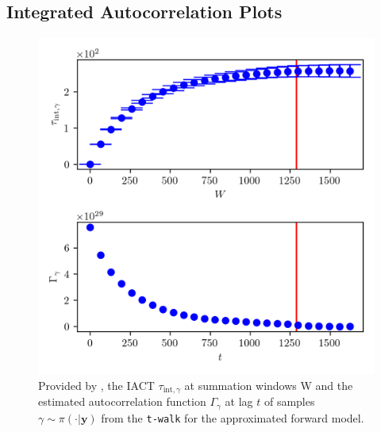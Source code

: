 \subsection{Integrated Autocorrelation Plots} 
\begin{figure}[ht!]
	\centering
	\includegraphics{UwerrTauIntTWalk0.png}
	\caption[IACT and autocorrelation function of samples $\gamma \sim \pi(\cdot|\bm{y})$, for approximated model.]{Provided by \cite{drikHesse}, the IACT $\tau_{\text{int},\gamma }$ at summation windows W and the estimated autocorrelation function $\Gamma_{\gamma }$ at lag $t$ of samples $\gamma  \sim \pi( \cdot| \bm{y})$ from the \texttt{t-walk} for the approximated forward model.}
	\label{fig:TWalkIATC1}
\end{figure}
